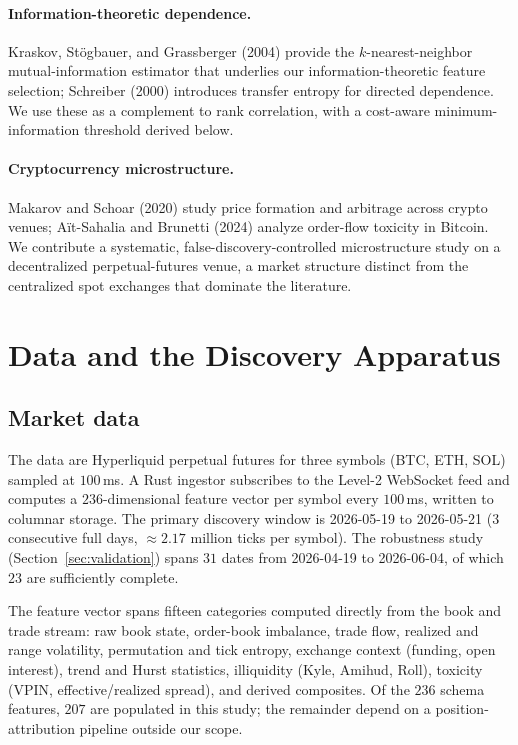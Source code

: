 \documentclass[11pt,a4paper]{article}
\theoremstyle{definition}
\theoremstyle{plain}
\begin{document}
\paragraph{Information-theoretic dependence.}
Kraskov, St\"ogbauer, and Grassberger (2004) provide the $k$-nearest-neighbor mutual-information
estimator that underlies our information-theoretic feature selection; Schreiber (2000) introduces
transfer entropy for directed dependence. We use these as a complement to rank correlation, with
a cost-aware minimum-information threshold derived below.

\paragraph{Cryptocurrency microstructure.}
Makarov and Schoar (2020) study price formation and arbitrage across crypto venues; A\"it-Sahalia
and Brunetti (2024) analyze order-flow toxicity in Bitcoin. We contribute a systematic,
false-discovery-controlled microstructure study on a decentralized perpetual-futures venue, a
market structure distinct from the centralized spot exchanges that dominate the literature.

\section{Data and the Discovery Apparatus}
\label{sec:data}

\subsection{Market data}

The data are Hyperliquid perpetual futures for three symbols (BTC, ETH, SOL) sampled at
$100$\,ms. A Rust ingestor subscribes to the Level-2 WebSocket feed and computes a
$236$-dimensional feature vector per symbol every $100$\,ms, written to columnar storage. The
primary discovery window is 2026-05-19 to 2026-05-21 ($3$ consecutive full days,
$\approx 2.17$ million ticks per symbol). The robustness study (Section~\ref{sec:validation})
spans $31$ dates from 2026-04-19 to 2026-06-04, of which $23$ are sufficiently complete.

The feature vector spans fifteen categories computed directly from the book and trade stream:
raw book state, order-book imbalance, trade flow, realized and range volatility, permutation and
tick entropy, exchange context (funding, open interest), trend and Hurst statistics, illiquidity
(Kyle, Amihud, Roll), toxicity (VPIN, effective/realized spread), and derived composites. Of the
$236$ schema features, $207$ are populated in this study; the remainder depend on a
position-attribution pipeline outside our scope.
\end{document}
